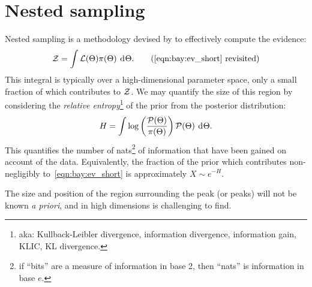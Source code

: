 \section{Nested sampling}
\label{sec:bay:nested_sampling}
%
Nested sampling is a methodology devised by \citet{skilling2006} to effectively compute the evidence:
\begin{equation}
  \ev = \int \lik(\params) \prior(\params) \: \d{\params}.
  \tag{\ref{eqn:bay:ev_short} revisited}
\end{equation}
This integral is typically over a high-dimensional parameter space, only a small fraction of which contributes to $\mathcal{Z}$. We may quantify the size of this region by considering the {\em relative entropy\/}\footnote{aka: Kullback-Leibler divergence, information divergence, information gain, KLIC, KL divergence.} of the prior from the posterior distribution:
\begin{equation}
  H = \int \log\left( \frac{\mathcal{P}(\Theta)}{\pi(\Theta)}\right) \mathcal{P}(\Theta)\: \operatorname{d}^{}\!{\Theta}.
  \label{eqn:bay:rel_ent}
\end{equation}  
This quantifies the number of nats\footnote{if ``bits'' are a measure of information in base 2, then ``nats'' is information in base $e$.} of information that have been gained on account of the data. Equivalently, the fraction of the prior which contributes non-negligibly to~\eqref{eqn:bay:ev_short} is approximately $X\sim e^{-H}$.

The size and position of the region surrounding the peak (or peaks) will not be known {\em a priori}, and in high dimensions is challenging to find.  

